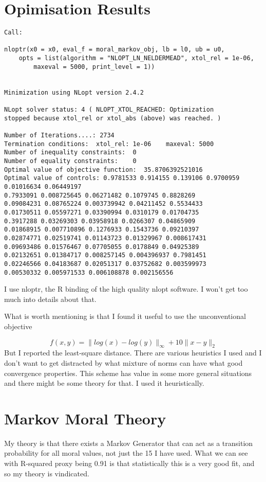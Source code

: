 \documentclass{amsart}
\begin{document}
\section{Opimisation Results}

\begin{verbatim}
Call:

nloptr(x0 = x0, eval_f = moral_markov_obj, lb = l0, ub = u0, 
    opts = list(algorithm = "NLOPT_LN_NELDERMEAD", xtol_rel = 1e-06, 
        maxeval = 5000, print_level = 1))


Minimization using NLopt version 2.4.2 

NLopt solver status: 4 ( NLOPT_XTOL_REACHED: Optimization 
stopped because xtol_rel or xtol_abs (above) was reached. )

Number of Iterations....: 2734 
Termination conditions:  xtol_rel: 1e-06	maxeval: 5000 
Number of inequality constraints:  0 
Number of equality constraints:    0 
Optimal value of objective function:  35.8706392521016 
Optimal value of controls: 0.9781533 0.914155 0.139106 0.9700959 0.01016634 0.06449197 
0.7933091 0.008725645 0.06271482 0.1079745 0.8828269 
0.09084231 0.08765224 0.003739942 0.04211452 0.5534433 
0.01730511 0.05597271 0.03390994 0.0310179 0.01704735 
0.3917288 0.03269303 0.03958918 0.0266307 0.04865909 
0.01868915 0.007710896 0.1276933 0.1543736 0.09210397 
0.02874771 0.02519741 0.01143723 0.01329967 0.008617431 
0.09693486 0.01576467 0.07705055 0.0178849 0.04925389 
0.02132651 0.01384717 0.008257145 0.004396937 0.7981451 
0.02246566 0.04183687 0.02051317 0.03752682 0.003599973 
0.00530332 0.005971533 0.006108878 0.002156556
\end{verbatim}


I use nloptr, the R binding of the high quality nlopt software.  I won't get too much into details about that.

What is worth mentioning is that I found it useful to use the unconventional objective

\[
f(x,y) = \| log(x)-log(y) \|_{\infty} + 10 \| x - y \|_2
\]
But I reported the least-square distance.  There are various heuristics I used and I don't want to get distracted by what mixture of norms can have what good convergence properties.  This scheme has value in some more general situations and there might be some theory for that.  I used it heuristically.

\section{Markov Moral Theory}

My theory is that there exists a Markov Generator that can act as a transition probability for all moral values, not just the 15 I have used.  What we can see with R-squared proxy being 0.91 is that statistically this is a very good fit, and so my theory is vindicated.
\end{document}
